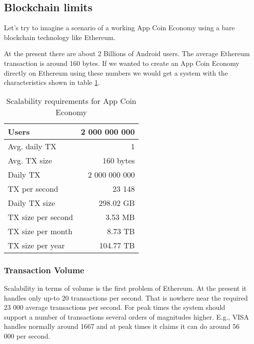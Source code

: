 \subsection{Blockchain limits}


Let's try to imagine a scenario of a working App Coin Economy using a bare blockchain technology like Ethereum.

At the present there are about 2 Billions of Android users. The average Ethereum transaction is around 160 bytes\cite{EthereumTransactions}. If we wanted to create an App Coin Economy directly on Ethereum using these numbers we would get a system with the characteristics shown in table \ref{table:ethereumscalability}.

\begin{table}[!htbp]
\centering
\begin{tabular}{|l|r|}
\hline
Users              & 2 000 000 000    \\ \hline
Avg. daily TX      & 1                \\ \hline
Avg. TX size       & 160 bytes        \\ \hline
Daily TX           & 2 000 000 000    \\ \hline
TX per second      & 23 148           \\ \hline
Daily TX size      & 298.02 GB        \\ \hline
TX size per second & 3.53 MB          \\ \hline
TX size per month  & 8.73 TB          \\ \hline
TX size per year   & 104.77 TB        \\ \hline
\end{tabular}
\caption{Scalability requirements for App Coin Economy}
\label{table:ethereumscalability}
\end{table}


\subsubsection{Transaction Volume}
Scalability in terms of volume is the first problem of Ethereum. At the present it handles only up-to 20 transactions per second\cite{eth_scaling}. That is nowhere near the required 23 000 average transactions per second. For peak times the system should support a number of transactions several orders of magnitudes higher. E.g., VISA handles normally around 1667 and at peak times it claims it can do around 56 000 per second\cite{eth_scaling}.

